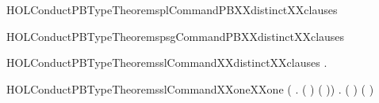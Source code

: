 \begin{SaveVerbatim}{HOLConductPBTypeTheoremsplCommandPBXXdistinctXXclauses}
\HOLTokenTurnstile{}  \HOLSymConst{\HOLTokenNotEqual{}}  \HOLSymConst{\HOLTokenConj{}}  \HOLSymConst{\HOLTokenNotEqual{}}  \HOLSymConst{\HOLTokenConj{}}
    \HOLSymConst{\HOLTokenNotEqual{}}  \HOLSymConst{\HOLTokenConj{}}  \HOLSymConst{\HOLTokenNotEqual{}}  \HOLSymConst{\HOLTokenConj{}}
    \HOLSymConst{\HOLTokenNotEqual{}}  \HOLSymConst{\HOLTokenConj{}}  \HOLSymConst{\HOLTokenNotEqual{}} 
\end{SaveVerbatim}
\newcommand{\HOLConductPBTypeTheoremsplCommandPBXXdistinctXXclauses}{\UseVerbatim{HOLConductPBTypeTheoremsplCommandPBXXdistinctXXclauses}}
\begin{SaveVerbatim}{HOLConductPBTypeTheoremspsgCommandPBXXdistinctXXclauses}
\HOLTokenTurnstile{}  \HOLSymConst{\HOLTokenNotEqual{}} 
\end{SaveVerbatim}
\newcommand{\HOLConductPBTypeTheoremspsgCommandPBXXdistinctXXclauses}{\UseVerbatim{HOLConductPBTypeTheoremspsgCommandPBXXdistinctXXclauses}}
\begin{SaveVerbatim}{HOLConductPBTypeTheoremsslCommandXXdistinctXXclauses}
\HOLTokenTurnstile{} \HOLSymConst{\HOLTokenForall{}} .   \HOLSymConst{\HOLTokenNotEqual{}}  
\end{SaveVerbatim}
\newcommand{\HOLConductPBTypeTheoremsslCommandXXdistinctXXclauses}{\UseVerbatim{HOLConductPBTypeTheoremsslCommandXXdistinctXXclauses}}
\begin{SaveVerbatim}{HOLConductPBTypeTheoremsslCommandXXoneXXone}
\HOLTokenTurnstile{} (\HOLSymConst{\HOLTokenForall{}} . (  \HOLSymConst{=}  ) \HOLSymConst{\HOLTokenEquiv{}} ( \HOLSymConst{=} )) \HOLSymConst{\HOLTokenConj{}}
   \HOLSymConst{\HOLTokenForall{}} . (  \HOLSymConst{=}  ) \HOLSymConst{\HOLTokenEquiv{}} ( \HOLSymConst{=} )
\end{SaveVerbatim}

